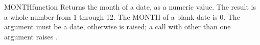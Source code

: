 \begin{XbaseEntry}{MONTH}{function}
Returns the month of a date, as a numeric value.
\Syntax
{}
\Usage
The result is a whole number from 1 through 12. The MONTH of a blank date is 0. The argument must be a date, otherwise  is raised; a call with other than one argument raises .
\Examples
{}
\end{XbaseEntry}

